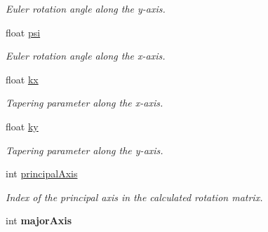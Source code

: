 \begin{DoxyCompactItemize}
\begin{DoxyCompactList}\small\item\em Euler rotation angle along the y-\/axis. \end{DoxyCompactList}\item 
\hypertarget{classope_1_1_s_q_parameters_ab94c2a1ca5063cfbed175f6c6c8bdb51}{float \hyperlink{classope_1_1_s_q_parameters_ab94c2a1ca5063cfbed175f6c6c8bdb51}{psi}}\label{classope_1_1_s_q_parameters_ab94c2a1ca5063cfbed175f6c6c8bdb51}

\begin{DoxyCompactList}\small\item\em Euler rotation angle along the x-\/axis. \end{DoxyCompactList}\item 
\hypertarget{classope_1_1_s_q_parameters_a66ad57af51fb313e1188e1315e926738}{float \hyperlink{classope_1_1_s_q_parameters_a66ad57af51fb313e1188e1315e926738}{kx}}\label{classope_1_1_s_q_parameters_a66ad57af51fb313e1188e1315e926738}

\begin{DoxyCompactList}\small\item\em Tapering parameter along the x-\/axis. \end{DoxyCompactList}\item 
\hypertarget{classope_1_1_s_q_parameters_a98833e7b6eb823ffc710e7ae3e8c85bf}{float \hyperlink{classope_1_1_s_q_parameters_a98833e7b6eb823ffc710e7ae3e8c85bf}{ky}}\label{classope_1_1_s_q_parameters_a98833e7b6eb823ffc710e7ae3e8c85bf}

\begin{DoxyCompactList}\small\item\em Tapering parameter along the y-\/axis. \end{DoxyCompactList}\item 
\hypertarget{classope_1_1_s_q_parameters_a6a013cefe5a5f6a6ffaa6a5ec272b246}{int \hyperlink{classope_1_1_s_q_parameters_a6a013cefe5a5f6a6ffaa6a5ec272b246}{principal\-Axis}}\label{classope_1_1_s_q_parameters_a6a013cefe5a5f6a6ffaa6a5ec272b246}

\begin{DoxyCompactList}\small\item\em Index of the principal axis in the calculated rotation matrix. \end{DoxyCompactList}\item 
\hypertarget{classope_1_1_s_q_parameters_a607b33c81cfb6030d17c07f2a1e65006}{int {\bfseries major\-Axis}}\label{classope_1_1_s_q_parameters_a607b33c81cfb6030d17c07f2a1e65006}


\end{DoxyCompactItemize}
